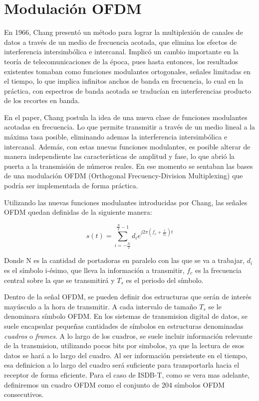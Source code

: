 \section{Modulación OFDM}

En 1966, Chang presentó un método para lograr la multiplexión de canales de datos a través de un medio de frecuencia acotada, que elimina los efectos de interferencia intersimbólica e intercanal\cite{chang-ofdm}. Implicó un cambio importante en la teoría de telecomunicaciones de la época, pues hasta entonces, los resultados existentes tomaban como funciones modulantes ortogonales, señales limitadas en el tiempo, lo que implica infinitos anchos de banda en frecuencia, lo cual en la práctica, con espectros de banda acotada se traducían en interferencias producto de los recortes en banda. 

En el paper, Chang postula la idea de una nueva clase de funciones modulantes acotadas en frecuencia. Lo que permite transmitir a través de un medio lineal a la máxima tasa posible, eliminando ademas la interferencia intersimbólica e intercanal. Además, con estas nuevas funciones modulantes, es posible alterar de manera independiente las características de amplitud y fase, lo que abrió la puerta a la transmisión de números reales. En ese momento se sentaban las bases de una modulación OFDM (Orthogonal Frecuency-Division Multiplexing) que podría ser implementada de forma práctica.

Utilizando las nuevas funciones modulantes introducidas por Chang, las señales OFDM quedan definidas de la siguiente manera:

\begin{equation}
s(t) = \sum_{i=-\frac{N}{2}}^{\frac{N}{2} - 1} d_{i} e^{j2\pi(f_c + \frac{i}{T_s})t}
\end{equation}

Donde N es la cantidad de portadoras en paralelo con las que se va a trabajar, $d_i$ es el símbolo i-ésimo, que lleva la información a transmitir, $f_c$ es la frecuencia central sobre la que se transmitirá y $T_s$ es el periodo del símbolo. 

Dentro de la señal OFDM, se pueden definir dos estructuras que serán de interés mayúsculo a la hora de transmitir. A cada intervalo de tamaño $T_s$ se le denominara símbolo OFDM. En los sistemas de transmision digital de datos, se suele encapsular pequeñas cantidades de símbolos en estructuras denominadas \textit{cuadros} o \textit{frames}. A lo largo de los cuadros, se suele incluir información relevante de la transmision, utilizando pocos bits por simbolos, ya que la lectura de esos datos se hará a lo largo del cuadro. Al ser información persistente en el tiempo, esa definicion a lo largo del cuadro será suficiente para transportarla hacia el receptor de forma eficiente. Para el caso de ISDB-T, como se vera mas adelante, definiremos un cuadro OFDM como el conjunto de 204 símbolos OFDM consecutivos.

